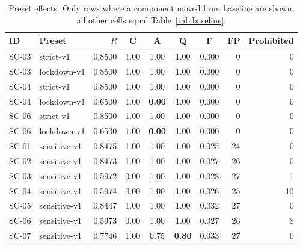 \documentclass[11pt]{article}
\begin{document}
\begin{table}[h]
\centering
\caption{Preset effects. Only rows where a component moved from baseline are shown; all other cells equal Table~\ref{tab:baseline}.}
\label{tab:presets}
\small
\begin{tabular}{l l r c c c c r r}
\toprule
\textbf{ID} & \textbf{Preset} & \textbf{$R$} & \textbf{C} & \textbf{A} & \textbf{Q} & \textbf{F} & \textbf{FP} & \textbf{Prohibited}\\
\midrule
SC-03 & strict-v1   & 0.8500 & 1.00 & 1.00 & 1.00 & 0.000 & 0  & 0\\
SC-03 & lockdown-v1 & 0.8500 & 1.00 & 1.00 & 1.00 & 0.000 & 0  & 0\\
SC-04 & strict-v1   & 0.8500 & 1.00 & 1.00 & 1.00 & 0.000 & 0  & 0\\
SC-04 & lockdown-v1 & 0.6500 & 1.00 & \textbf{0.00} & 1.00 & 0.000 & 0  & 0\\
SC-06 & strict-v1   & 0.8500 & 1.00 & 1.00 & 1.00 & 0.000 & 0  & 0\\
SC-06 & lockdown-v1 & 0.6500 & 1.00 & \textbf{0.00} & 1.00 & 0.000 & 0  & 0\\
\midrule
SC-01 & sensitive-v1 & 0.8475 & 1.00 & 1.00 & 1.00 & 0.025 & 24 & 0\\
SC-02 & sensitive-v1 & 0.8473 & 1.00 & 1.00 & 1.00 & 0.027 & 26 & 0\\
SC-03 & sensitive-v1 & 0.5972 & 0.00 & 1.00 & 1.00 & 0.028 & 27 & 1\\
SC-04 & sensitive-v1 & 0.5974 & 0.00 & 1.00 & 1.00 & 0.026 & 25 & 10\\
SC-05 & sensitive-v1 & 0.8447 & 1.00 & 1.00 & 1.00 & 0.032 & 27 & 0\\
SC-06 & sensitive-v1 & 0.5973 & 0.00 & 1.00 & 1.00 & 0.027 & 26 & 8\\
SC-07 & sensitive-v1 & 0.7746 & 1.00 & 0.75 & \textbf{0.80} & 0.033 & 27 & 0\\
\bottomrule
\end{tabular}
\end{table}
\end{document}
